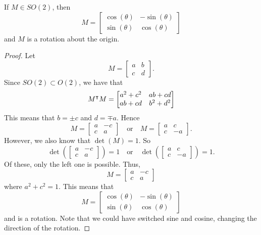 \documentclass{ximera}
\begin{document}
\begin{lemma}\label{L:SO}
  If $M\in SO(2)$, then
  \[
  M =
  \begin{bmatrix}
    \cos(\theta) & -\sin(\theta) \\
    \sin(\theta) & \cos(\theta)
  \end{bmatrix}
  \]
  and $M$ is a rotation about the origin.
  \begin{proof}
    Let
    \[
    M=
    \begin{bmatrix}
      a & b \\
      c & d
    \end{bmatrix}.
    \]
    Since $SO(2) \subset O(2)$, we have that
    \[
    M^\intercal M =
    \begin{bmatrix}
      a^2+c^2 & ab+cd\\
      ab + cd & b^2+d^2
    \end{bmatrix}
    \]
    This means that $b= \pm c$ and $d = \mp a$. Hence
    \[
    M = \begin{bmatrix}
      a & -c \\
      c & a
    \end{bmatrix}
    \quad\text{or}\quad
    M = \begin{bmatrix}
      a & c \\
      c & -a
    \end{bmatrix}.
    \]
    However, we also know that $\det(M) = 1$.  So
    \[
    \det\left(\begin{bmatrix}
      a & -c \\
      c & a
    \end{bmatrix}\right) = 1\quad\text{or}\quad
     \det\left(\begin{bmatrix}
      a & c \\
      c & -a
     \end{bmatrix}\right) = 1.
     \]
     Of these, only the left one is possible.  Thus,
    \[
     M = \begin{bmatrix}
      a & -c \\
      c & a
    \end{bmatrix}
     \]
     where $a^2 + c^2 = 1$. This means that
     \[
     M =
     \begin{bmatrix}
       \cos(\theta) & -\sin(\theta) \\
       \sin(\theta) & \cos(\theta)
     \end{bmatrix}
     \]
     and is a rotation. Note that we could have switched sine and
     cosine, changing the direction of the rotation.
  \end{proof}
\end{lemma}
\end{document}
